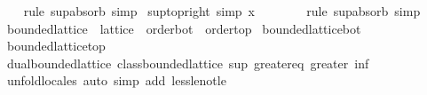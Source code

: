 \begin{isabellebody}
%
\isadelimproof
\ \ %
\endisadelimproof
%
\isatagproof
{}\isamarkupfalse%
\ {\isacharparenleft}{\kern0pt}rule\ sup{\isacharunderscore}{\kern0pt}absorb{}{\isacharparenright}{\kern0pt}\ simp%
\endisatagproof
{\isafoldproof}%
%
\isadelimproof
\isanewline
%
\endisadelimproof
\isanewline
{}\isamarkupfalse%
\ sup{\isacharunderscore}{\kern0pt}top{\isacharunderscore}{\kern0pt}right\ {\isacharbrackleft}{\kern0pt}simp{\isacharbrackright}{\kern0pt}{\isacharcolon}{\kern0pt}\ {\isachardoublequoteopen}x\ {\isasymsqunion}\ {\isasymtop}\ {\isacharequal}{\kern0pt}\ {\isasymtop}{\isachardoublequoteclose}\isanewline
%
\isadelimproof
\ \ %
\endisadelimproof
%
\isatagproof
{}\isamarkupfalse%
\ {\isacharparenleft}{\kern0pt}rule\ sup{\isacharunderscore}{\kern0pt}absorb{}{\isacharparenright}{\kern0pt}\ simp%
\endisatagproof
{\isafoldproof}%
%
\isadelimproof
\isanewline
%
\endisadelimproof
\isanewline
{}\isamarkupfalse%
\isanewline
\isanewline
{}\isamarkupfalse%
\ bounded{\isacharunderscore}{\kern0pt}lattice\ {\isacharequal}{\kern0pt}\ lattice\ {\isacharplus}{\kern0pt}\ order{\isacharunderscore}{\kern0pt}bot\ {\isacharplus}{\kern0pt}\ order{\isacharunderscore}{\kern0pt}top\isanewline
{}\isanewline
\isanewline
{}\isamarkupfalse%
\ bounded{\isacharunderscore}{\kern0pt}lattice{\isacharunderscore}{\kern0pt}bot%
\isadelimproof
\ %
\endisadelimproof
%
\isatagproof
\isacommand{{\isachardot}{\kern0pt}{\isachardot}{\kern0pt}}\isamarkupfalse%
%
\endisatagproof
{\isafoldproof}%
%
\isadelimproof
%
\endisadelimproof
\isanewline
{}\isamarkupfalse%
\ bounded{\isacharunderscore}{\kern0pt}lattice{\isacharunderscore}{\kern0pt}top%
\isadelimproof
\ %
\endisadelimproof
%
\isatagproof
\isacommand{{\isachardot}{\kern0pt}{\isachardot}{\kern0pt}}\isamarkupfalse%
%
\endisatagproof
{\isafoldproof}%
%
\isadelimproof
%
\endisadelimproof
\isanewline
\isanewline
{}\isamarkupfalse%
\ dual{\isacharunderscore}{\kern0pt}bounded{\isacharunderscore}{\kern0pt}lattice{\isacharcolon}{\kern0pt}\ {\isachardoublequoteopen}class{\isachardot}{\kern0pt}bounded{\isacharunderscore}{\kern0pt}lattice\ sup\ greater{\isacharunderscore}{\kern0pt}eq\ greater\ inf\ {\isasymtop}\ {\isasymbottom}{\isachardoublequoteclose}\isanewline
%
\isadelimproof
\ \ %
\endisadelimproof
%
\isatagproof
{}\isamarkupfalse%
\ unfold{\isacharunderscore}{\kern0pt}locales\ {\isacharparenleft}{\kern0pt}auto\ simp\ add{\isacharcolon}{\kern0pt}\ less{\isacharunderscore}{\kern0pt}le{\isacharunderscore}{\kern0pt}not{\isacharunderscore}{\kern0pt}le{\isacharparenright}{\kern0pt}%

\end{isabellebody}
